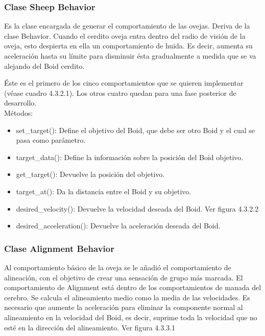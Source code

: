 \subsubsection{Clase Sheep Behavior}
\label{subsubsection:sheep_behavior}

Es la clase encargada de generar el comportamiento de las ovejas. Deriva de la clase Behavior. Cuando el cerdito oveja entra dentro del 
radio de visión de la oveja, esto despierta en ella un comportamiento de huida. Es decir, aumenta su aceleración hasta su límite para 
disminuir ésta gradualmente a medida que se va alejando del Boid cerdito.

Éste es el primero de los cinco comportamientos que se quieren implementar (véase cuadro 4.3.2.1). Los otros cuatro quedan para una fase 
posterior de desarrollo.\\

Métodos:
\begin{itemize}
\item set\_target():
Define el objetivo del Boid, que debe ser otro Boid y el cual se pasa como parámetro.

\item target\_data():
Define la información sobre la posición del Boid objetivo.

\item get\_target():
Devuelve la posición del objetivo.

\item target\_at():
Da la distancia entre el Boid y su objetivo.

\item desired\_velocity():
Devuelve la velocidad deseada del Boid. Ver figura 4.3.2.2

\item desired\_acceleration():
Devuelve la aceleración deseada del Boid.
\end{itemize}

\subsubsection{Clase Alignment Behavior}
\label{subsubsection:alignment_behavior}

Al comportamiento básico de la oveja se le añadió el comportamiento de alineación, con el objetivo de crear una sensación de grupo más 
marcada. El comportamiento de Alignment está dentro de los comportamientos de manada del cerebro.
Se calcula el alineamiento medio como la media de las velocidades. Es necesario que aumente la aceleración para eliminar la componente 
normal al alineamiento en la velocidad del Boid, es decir, suprime toda la velocidad que no esté en la dirección del alineamiento. Ver figura 4.3.3.1\\



